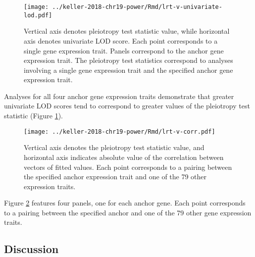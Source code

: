 \documentclass[oneside]{book}
\begin{document}
\begin{figure}
    \centering
    \texttt{[image: ../keller-2018-chr19-power/Rmd/lrt-v-univariate-lod.pdf]}
    \caption[Pleiotropy LRT vs. univariate LOD score plots reveal that greater univariate LOD scores (and greater interlocus distance) tend to correspond to greater pleiotropy LRT values.]{Vertical axis denotes pleiotropy test statistic value, while horizontal axis denotes univariate LOD score. Each point corresponds to a single gene expression trait. Panels correspond to the anchor gene expression trait. The pleiotropy test statistics correspond to analyses involving a single gene expression trait and the specified anchor gene expression trait.}
    \label{fig:lod}
\end{figure}

Analyses for all four anchor gene expression traits demonstrate that greater univariate LOD scores tend to correspond to greater values of the pleiotropy test statistic (Figure \ref{fig:lod}).









\begin{figure}
    \centering
    \texttt{[image: ../keller-2018-chr19-power/Rmd/lrt-v-corr.pdf]}
    \caption[Pleiotropy LRT vs. fitted values correlations plots reveal little evidence for a relationship.]{Vertical axis denotes the pleiotropy test statistic value, and horizontal axis indicates absolute value of the correlation between vectors of fitted values. Each point corresponds to a pairing between the specified anchor expression trait and one of the 79 other expression traits.}
    \label{fig:cor}
\end{figure}

Figure \ref{fig:cor} features four panels, one for each anchor gene. Each point corresponds to a pairing between the specified anchor and one of the 79 other gene expression traits.



\subsection{Discussion}
\end{document}
